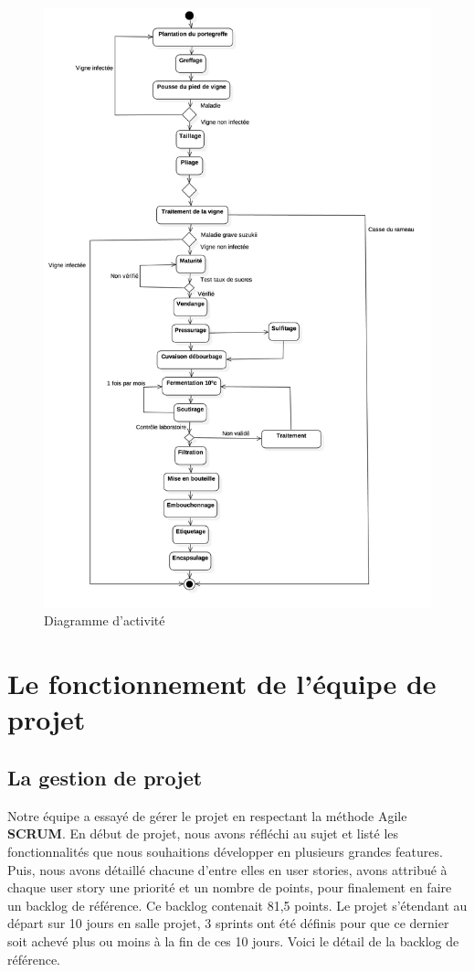 \documentclass[a4paper, titlepage]{report}
\begin{document}
\clearpage
\begin{figure}[!h]
\centering
\includegraphics{Images/DiagrammeActivite.jpg}
\caption{Diagramme d'activité}
\end{figure}

\clearpage
\section{Le fonctionnement de l'équipe de
projet}

\subsection{La gestion de projet}

Notre équipe a essayé de gérer le projet en respectant la méthode Agile
\textbf{SCRUM}. En début de projet, nous avons réfléchi au sujet et
listé les fonctionnalités que nous souhaitions développer en plusieurs
grandes features. Puis, nous avons détaillé chacune d'entre elles en
user stories, avons attribué à chaque user story une priorité et un
nombre de points, pour finalement en faire
un backlog de référence. Ce backlog contenait 81,5 points. Le projet
s'étendant au départ sur 10 jours en salle projet, 3 sprints ont été
définis pour que ce dernier soit achevé plus ou moins à la fin de ces 10
jours. Voici le détail de la backlog de référence.
\end{document}
